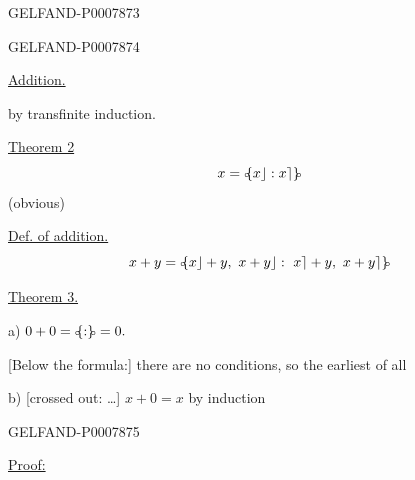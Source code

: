 \begin{GelfandAdjacentEvidence}{GELFAND-P000787}{3}

\end{GelfandAdjacentEvidence}
\begin{GelfandAdjacentEvidence}{GELFAND-P000787}{4}


\underline{Addition.}

by transfinite induction.

\underline{Theorem 2}
\[
x=\mathopen{{\scriptstyle\circ}\mkern-5mu\{} x\rfloor:x\rceil \mathclose{\}\mkern-5mu{\scriptstyle\circ}}
\]
(obvious)

\underline{Def. of addition.}
\[
x+y=\mathopen{{\scriptstyle\circ}\mkern-5mu\{} x\rfloor+y,\ x+y\rfloor:\ x\rceil+y,\ x+y\rceil \mathclose{\}\mkern-5mu{\scriptstyle\circ}}
\]

\underline{Theorem 3.}

a) \(0+0=\mathopen{{\scriptstyle\circ}\mkern-5mu\{} : \mathclose{\}\mkern-5mu{\scriptstyle\circ}}=0.\)

[Below the formula:] there are no conditions, so the earliest of all

b) [crossed out: \ldots{}] \(x+0=x\) by induction
\end{GelfandAdjacentEvidence}
\begin{GelfandAdjacentEvidence}{GELFAND-P000787}{5}


\underline{Proof:}
\end{GelfandAdjacentEvidence}
